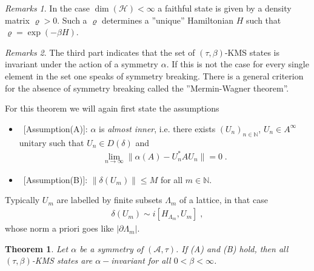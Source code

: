 \documentclass[
a4paper, %
11pt, %
onecolumn, %
openany, %
]{memoir}
\theoremstyle{definition}
\theoremstyle{remark}
\newtheorem{remarks}{Remarks}[chapter]
\theoremstyle{plain}
\newtheorem{theorem}{Theorem}[chapter]
\begin{document}
\begin{remarks}
In the case $\dim(\mathcal{H})<\infty$ a faithful state is given by a density matrix $\varrho>0$. Such a $\varrho$ determines a ''unique'' Hamiltonian $H$ such that $\varrho=\exp(-\beta H)$.
\end{remarks}
\begin{remarks}
The third part indicates that the set of $(\tau,\beta)$-KMS states is invariant under the action of a symmetry $\alpha$. If this is not the case for every single element in the set one speaks of symmetry breaking. There is a general criterion for the absence of symmetry breaking called the ''Mermin-Wagner theorem''.
\end{remarks}
For this theorem we will again first state the assumptions \begin{itemize}
\item~[Assumption(A)]: $\alpha$ is \textit{almost inner}, i.e. there exists $(U_n)_{n\in\mathbb{N}}$, $U_n\in A^{\infty}$ unitary such that $U_n\in D(\delta)$ and \begin{align}
\lim\limits_{n\rightarrow\infty}\|\alpha(A)-U_n^*AU_n\| =0 \; .
\end{align}
\item~[Assumption(B)]: $\|\delta(U_m)\|\leq M$ for all $m\in\mathbb{N}$.
\end{itemize}
Typically $U_m$ are labelled by finite subsets $\Lambda_m$ of a lattice, in that case \begin{align}
\delta(U_m)\sim i[H_{\Lambda_m},U_m]\; ,
\end{align}
whose norm a priori goes like $|\partial\Lambda_m|$.
\begin{theorem}
Let $\alpha$ be a symmetry of $(\mathcal{A},\tau)$. If (A) and (B) hold, then all $(\tau,\beta)$-KMS states are $\alpha-$invariant for all $0<\beta<\infty$.
\end{theorem}
\end{document}
